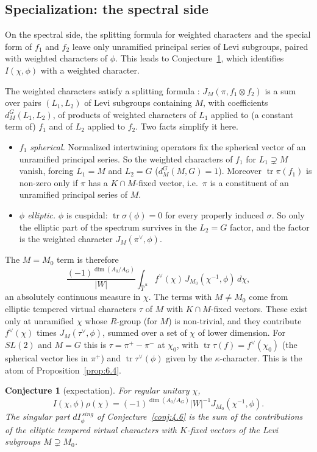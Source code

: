 \documentclass[12pt,letterpaper]{article}
\numberwithin{equation}{section}
\theoremstyle{plain}
\newtheorem{conjecture}[lemma]{Conjecture}
\theoremstyle{remark}
\theoremstyle{plain}
\theoremstyle{definition}
\theoremstyle{remark}
\newcounter{rtw}
\theoremstyle{remark}
\newcommand{\Thu}{\widehat{T}^{\,u}}
\DeclareMathOperator{\tr}{tr}
\begin{document}
\subsection{Specialization: the spectral side}\label{sec:7.3}

On the spectral side, the splitting formula for weighted characters and the special form of $f_1$ and $f_2$ leave only unramified principal series of Levi subgroups, paired with weighted characters of $\phi$. This leads to Conjecture~\ref{conj:7.3}, which identifies $I(\chi,\phi)$ with a weighted character.

The weighted characters satisfy a splitting formula \cite{Ar88}: $J_M(\pi,f_1\otimes f_2)$ is a sum over pairs $(L_1,L_2)$ of Levi subgroups containing $M$, with coefficients $d_M^G(L_1,L_2)$, of products of weighted characters of $L_1$ applied to (a constant term of) $f_1$ and of $L_2$ applied to $f_2$. Two facts simplify it here.
\begin{itemize}
\item \emph{$f_1$ spherical.} Normalized intertwining operators fix the spherical vector of an unramified principal series. So the weighted characters of $f_1$ for $L_1\supsetneq M$ vanish, forcing $L_1=M$ and $L_2=G$ ($d^G_M(M,G)=1$). Moreover $\tr\pi(f_1)$ is non-zero only if $\pi$ has a $K\cap M$-fixed vector, i.e.\ $\pi$ is a constituent of an unramified principal series of $M$.
\item \emph{$\phi$ elliptic.} $\phi$ is cuspidal: $\tr\sigma(\phi)=0$ for every properly induced $\sigma$. So only the elliptic part of the spectrum survives in the $L_2=G$ factor, and the factor is the weighted character $J_M(\pi^\vee,\phi)$.
\end{itemize}
The $M=M_0$ term is therefore
\[
\frac{(-1)^{\dim(A_0/A_G)}}{|W|}\int_{\Thu}f^\vee(\chi)\,J_{M_0}(\chi^{-1},\phi)\,d\chi,
\]
an absolutely continuous measure in $\chi$. The terms with $M\ne M_0$ come from elliptic tempered virtual characters $\tau$ of $M$ with $K\cap M$-fixed vectors. These exist only at unramified $\chi$ whose $R$-group (for $M$) is non-trivial, and they contribute $f^\vee(\chi)$ times $J_M(\tau^\vee,\phi)$, summed over a set of $\chi$ of lower dimension. For $SL(2)$ and $M=G$ this is $\tau=\pi^+-\pi^-$ at $\chi_0$, with $\tr\tau(f)=f^\vee(\chi_0)$ (the spherical vector lies in $\pi^+$) and $\tr\tau^\vee(\phi)$ given by the $\kappa$-character. This is the atom of Proposition~\ref{prop:6.4}.

\setcounter{lemma}{2}%
\begin{conjecture}[expectation]\label{conj:7.3}
For regular unitary $\chi$,
\[
I(\chi,\phi)\rho(\chi)=(-1)^{\dim(A_0/A_G)}|W|^{-1}J_{M_0}(\chi^{-1},\phi).
\] The singular part $dI_\phi^{\,sing}$ of Conjecture~\ref{conj:4.6} is the sum of the contributions of the elliptic tempered virtual characters with $K$-fixed vectors of the Levi subgroups $M\supsetneq M_0$.
\end{conjecture}
\end{document}
